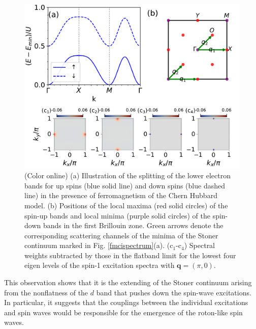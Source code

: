 \documentclass[amsmath,superscriptaddress,showpacs,aps,prb,twocolumn]{revtex4-1}
\begin{document}
\begin{figure}
\includegraphics[width=\columnwidth]{bspicture}
\caption{(Color online) (a) Illustration of the splitting of the lower electron bands for up spins (blue solid line) and down spins (blue dashed line) in the presence of ferromagnetism of the Chern Hubbard model. (b) Positions of the local maxima (red solid circles) of the spin-up bands and local minima (purple solid circles) of the spin-down bands in the first Brillouin zone. Green arrows denote the corresponding scattering channels of the minima of the Stoner continuum marked in Fig. \ref{fmcispectrum}(a). (c$_1$-c$_4$) Spectral weights subtracted by those in the flatband limit for the lowest four eigen levels of the spin-1 excitation spectra with $\mathbf{q}=(\pi,0)$.}
\label{bspicture}
\end{figure}

\par This observation shows that it is the extending of the Stoner continuum arising from the nonflatness of the $d$ band that pushes down the spin-wave excitations. In particular, it suggests that the couplings between the individual excitations and spin waves would be responsible for the emergence of the roton-like spin waves.
\end{document}
